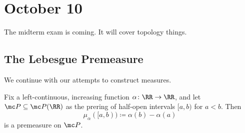 \documentclass[../notes.tex]{subfiles}
\begin{document}
\section{October 10}

The midterm exam is coming. It will cover topology things.

\subsection{The Lebesgue Premeasure}
We continue with our attempts to construct measures.
\begin{prop} \label{prop:leb-premeasure}
	Fix a left-continuous, increasing function $\alpha\colon\RR\to\RR$, and let $\mc P\subseteq\mc P(\RR)$ as the prering of half-open intervals $[a,b)$ for $a<b$. Then
	\[\mu_\alpha([a,b))\coloneqq\alpha(b)-\alpha(a)\]
	is a premeasure on $\mc P$.
\end{prop}
\end{document}
